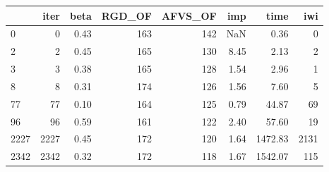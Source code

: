 \begin{tabular}{lrrrrrrr}
\toprule
{} &  iter &  beta &  RGD\_OF &  AFVS\_OF &  imp &    time &   iwi \\
\midrule
0    &     0 &  0.43 &     163 &      142 &  NaN &    0.36 &     0 \\
2    &     2 &  0.45 &     165 &      130 & 8.45 &    2.13 &     2 \\
3    &     3 &  0.38 &     165 &      128 & 1.54 &    2.96 &     1 \\
8    &     8 &  0.31 &     174 &      126 & 1.56 &    7.60 &     5 \\
77   &    77 &  0.10 &     164 &      125 & 0.79 &   44.87 &    69 \\
96   &    96 &  0.59 &     161 &      122 & 2.40 &   57.60 &    19 \\
2227 &  2227 &  0.45 &     172 &      120 & 1.64 & 1472.83 &  2131 \\
2342 &  2342 &  0.32 &     172 &      118 & 1.67 & 1542.07 &   115 \\
\bottomrule
\end{tabular}
